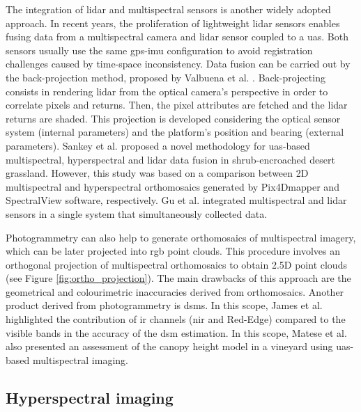 The integration of \acrshort{lidar} and multispectral sensors is another widely adopted approach. In recent years, the proliferation of lightweight \acrshort{lidar} sensors enables fusing data from a multispectral camera and \acrshort{lidar} sensor coupled to a \acrshort{uas}. Both sensors usually use the same \acrshort{gps}-\acrshort{imu} configuration to avoid registration challenges caused by time-space inconsistency. Data fusion can be carried out by the back-projection method, proposed by Valbuena et al. \cite{valbuena_integrating_2014}. Back-projecting consists in rendering \acrshort{lidar} from the optical camera’s perspective in order to correlate pixels and returns. Then, the pixel attributes are fetched and the \acrshort{lidar} returns are shaded. This projection is developed considering the optical sensor system (internal parameters) and the platform's position and bearing (external parameters). Sankey et al. \cite{sankey_quantifying_2021} proposed a novel methodology for \acrshort{uas}-based multispectral, hyperspectral and \acrshort{lidar} data fusion in shrub-encroached desert grassland. However, this study was based on a comparison between 2D multispectral and hyperspectral orthomosaics generated by Pix4Dmapper and SpectralView software, respectively. Gu et al. \cite{gu_uav-based_2020} integrated multispectral and \acrshort{lidar} sensors in a single system that simultaneously collected data. 

Photogrammetry can also help to generate orthomosaics of multispectral imagery, which can be later projected into \acrshort{rgb} point clouds. This procedure involves an orthogonal projection of multispectral orthomosaics to obtain 2.5D point clouds (see Figure \ref{fig:ortho_projection}). The main drawbacks of this approach are the geometrical and colourimetric inaccuracies derived from orthomosaics. Another product derived from photogrammetry is \acrshort{dsm}s. In this scope, James et al. \cite{james_uav_2021} highlighted the contribution of \acrshort{ir} channels (\acrshort{nir} and Red-Edge) compared to the visible bands in the accuracy of the \acrshort{dsm} estimation. In this scope, Matese et al. \cite{matese_assessment_2017} also presented an assessment of the canopy height model in a vineyard using \acrshort{uas}-based multispectral imaging.

\subsection{Hyperspectral imaging}

